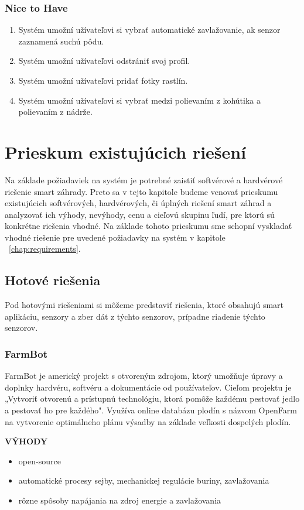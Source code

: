 \documentclass[twoside]{ctuthesis}
\theoremstyle{plain}
\theoremstyle{definition}
\theoremstyle{note}
\begin{document}
\subsection*{Nice to Have}
\begin{enumerate}
\item Systém umožní užívateľovi si vybrať automatické zavlažovanie, ak senzor zaznamená suchú pôdu. 
\item Systém umožní užívateľovi odstrániť svoj profil.
\item Systém umožní užívateľovi pridať fotky rastlín.
\item Systém umožní užívateľovi si vybrať medzi polievaním z kohútika a polievaním z nádrže.
\end{enumerate}

\chapter{Prieskum existujúcich riešení}
Na základe požiadaviek na systém je potrebné zaistiť softvérové a hardvérové riešenie smart záhrady. Preto sa v tejto kapitole budeme venovať prieskumu existujúcich softvérových, hardvérových, či úplných riešení smart záhrad a analyzovať ich výhody, nevýhody, cenu a cieľovú skupinu ľudí, pre ktorú sú konkrétne riešenia vhodné. Na základe tohoto prieskumu sme schopní vyskladať vhodné riešenie pre uvedené požiadavky na systém  v kapitole ~\ref{chap:requirements}.
\section{Hotové riešenia}
Pod hotovými riešeniami si môžeme predstaviť riešenia, ktoré obsahujú smart aplikáciu, senzory a zber dát z týchto senzorov, prípadne riadenie týchto senzorov.
\subsection*{FarmBot}
FarmBot je americký projekt s otvoreným zdrojom, ktorý umožňuje úpravy a doplnky hardvéru, softvéru a dokumentácie od používateľov. 
Cieľom projektu je „Vytvoriť otvorenú a prístupnú technológiu, ktorá pomôže každému pestovať jedlo a pestovať ho pre každého".
Využíva online databázu plodín s názvom OpenFarm na vytvorenie optimálneho plánu výsadby na základe veľkosti dospelých plodín.  \cite{farmbot}
\newline

\textbf{VÝHODY}
\begin{itemize}
\item open-source
\item automatické procesy sejby, mechanickej regulácie buriny, zavlažovania
\item rôzne spôsoby napájania na zdroj energie a zavlažovania
\end{itemize}
\end{document}
